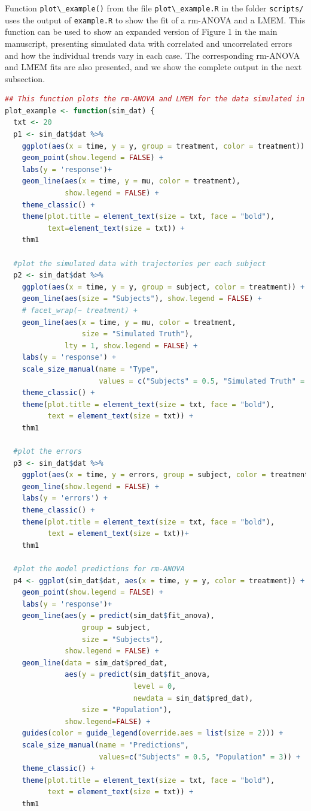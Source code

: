 \documentclass[
]{article}
\newcommand{\passthrough}[1]{#1}
\begin{document}
Function \passthrough{\lstinline!plot\_example()!} from the file \passthrough{\lstinline!plot\_example.R!} in the folder \passthrough{\lstinline!scripts/!} uses the output of \passthrough{\lstinline!example.R!} to show the fit of a rm-ANOVA and a LMEM. This function can be used to show an expanded version of Figure 1 in the main manuscript, presenting simulated data with correlated and uncorrelated errors and how the individual trends vary in each case. The corresponding rm-ANOVA and LMEM fits are also presented, and we show the complete output in the next subsection.

\begin{lstlisting}[language=R]
## This function plots the rm-ANOVA and LMEM for the data simulated in example.R
plot_example <- function(sim_dat) {
  txt <- 20
  p1 <- sim_dat$dat %>%
    ggplot(aes(x = time, y = y, group = treatment, color = treatment)) +
    geom_point(show.legend = FALSE) +
    labs(y = 'response')+
    geom_line(aes(x = time, y = mu, color = treatment), 
              show.legend = FALSE) +
    theme_classic() +
    theme(plot.title = element_text(size = txt, face = "bold"),
          text=element_text(size = txt)) +
    thm1
  
  #plot the simulated data with trajectories per each subject
  p2 <- sim_dat$dat %>%
    ggplot(aes(x = time, y = y, group = subject, color = treatment)) +
    geom_line(aes(size = "Subjects"), show.legend = FALSE) +
    # facet_wrap(~ treatment) +
    geom_line(aes(x = time, y = mu, color = treatment, 
                  size = "Simulated Truth"),
              lty = 1, show.legend = FALSE) +
    labs(y = 'response') +
    scale_size_manual(name = "Type", 
                      values = c("Subjects" = 0.5, "Simulated Truth" = 3)) +
    theme_classic() +
    theme(plot.title = element_text(size = txt, face = "bold"),
          text = element_text(size = txt)) +
    thm1
  
  #plot the errors
  p3 <- sim_dat$dat %>%
    ggplot(aes(x = time, y = errors, group = subject, color = treatment)) +
    geom_line(show.legend = FALSE) +
    labs(y = 'errors') +
    theme_classic() +
    theme(plot.title = element_text(size = txt, face = "bold"),
          text = element_text(size = txt))+
    thm1
  
  #plot the model predictions for rm-ANOVA
  p4 <- ggplot(sim_dat$dat, aes(x = time, y = y, color = treatment)) +
    geom_point(show.legend = FALSE) +
    labs(y = 'response')+
    geom_line(aes(y = predict(sim_dat$fit_anova), 
                  group = subject, 
                  size = "Subjects"),
              show.legend = FALSE) +
    geom_line(data = sim_dat$pred_dat,
              aes(y = predict(sim_dat$fit_anova,
                              level = 0,
                              newdata = sim_dat$pred_dat),
                  size = "Population"),
              show.legend=FALSE) +
    guides(color = guide_legend(override.aes = list(size = 2))) +
    scale_size_manual(name = "Predictions",
                      values=c("Subjects" = 0.5, "Population" = 3)) +
    theme_classic() +
    theme(plot.title = element_text(size = txt, face = "bold"),
          text = element_text(size = txt)) +
    thm1
  

\end{lstlisting}
\end{document}
